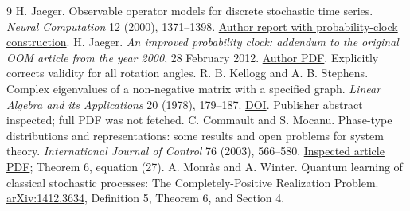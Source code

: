 \documentclass[11pt]{article}
\begin{document}
\begin{thebibliography}{9}
 H. Jaeger. Observable operator models for discrete stochastic time series. \emph{Neural Computation} 12 (2000), 1371--1398. \href{https://publica-rest.fraunhofer.de/server/api/core/bitstreams/c5799916-b434-4186-94ab-717cb74db946/content}{Author report with probability-clock construction}.
 H. Jaeger. \emph{An improved probability clock: addendum to the original OOM article from the year 2000}, 28 February 2012. \href{https://www.ai.rug.nl/minds/uploads/addendumProbClock.pdf}{Author PDF}. Explicitly corrects validity for all rotation angles.
 R. B. Kellogg and A. B. Stephens. Complex eigenvalues of a non-negative matrix with a specified graph. \emph{Linear Algebra and its Applications} 20 (1978), 179--187. \href{https://doi.org/10.1016/0024-3795(78)90049-6}{DOI}. Publisher abstract inspected; full PDF was not fetched.
 C. Commault and S. Mocanu. Phase-type distributions and representations: some results and open problems for system theory. \emph{International Journal of Control} 76 (2003), 566--580. \href{https://people.smp.uq.edu.au/YoniNazarathy/AMSIschool2016/CommaultMocanu_forAssignment.pdf}{Inspected article PDF}; Theorem 6, equation (27).
 A. Monr\`as and A. Winter. Quantum learning of classical stochastic processes: The Completely-Positive Realization Problem. \href{https://arxiv.org/abs/1412.3634}{arXiv:1412.3634}, Definition 5, Theorem 6, and Section 4.
\end{thebibliography}
\end{document}
